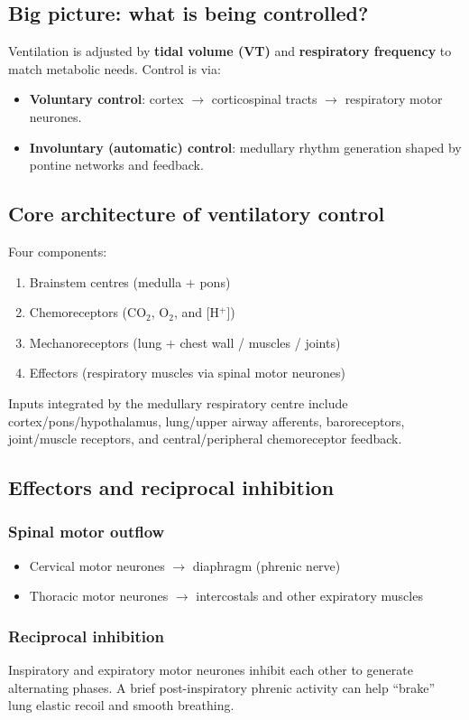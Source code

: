 \documentclass[11pt,a4paper]{article}
\begin{document}
\subsection{Big picture: what is being controlled?}
Ventilation is adjusted by \textbf{tidal volume (VT)} and \textbf{respiratory frequency} to match metabolic needs.
Control is via:
\begin{itemize}
  \item \textbf{Voluntary control}: cortex $\rightarrow$ corticospinal tracts $\rightarrow$ respiratory motor neurones.
  \item \textbf{Involuntary (automatic) control}: medullary rhythm generation shaped by pontine networks and feedback.
\end{itemize}

\subsection{Core architecture of ventilatory control}
Four components:
\begin{enumerate}
  \item Brainstem centres (medulla + pons)
  \item Chemoreceptors (CO$_2$, O$_2$, and [H$^+$])
  \item Mechanoreceptors (lung + chest wall / muscles / joints)
  \item Effectors (respiratory muscles via spinal motor neurones)
\end{enumerate}
Inputs integrated by the medullary respiratory centre include cortex/pons/hypothalamus, lung/upper airway afferents, baroreceptors, joint/muscle receptors, and central/peripheral chemoreceptor feedback.

\subsection{Effectors and reciprocal inhibition}
\subsubsection{Spinal motor outflow}
\begin{itemize}
  \item Cervical motor neurones $\rightarrow$ diaphragm (phrenic nerve)
  \item Thoracic motor neurones $\rightarrow$ intercostals and other expiratory muscles
\end{itemize}

\subsubsection{Reciprocal inhibition}
Inspiratory and expiratory motor neurones inhibit each other to generate alternating phases. A brief post-inspiratory phrenic activity can help ``brake'' lung elastic recoil and smooth breathing.
\end{document}
